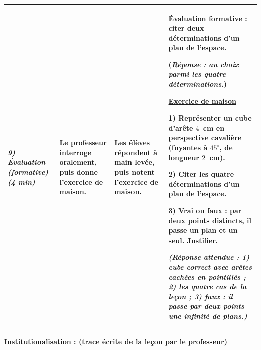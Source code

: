 \documentclass[10pt]{article}
\newcommand{\titreR}[1]{\underline{\textcolor{rougetitre}{\bfseries #1}}}
\newcommand{\maison}{\underline{\textcolor{rougemaison}{\bfseries Exercice de maison}}}
\newcommand{\moment}[1]{\textbf{\itshape #1}}
\begin{document}
\begin{longtable}{|p{2.35cm}|p{5.35cm}|p{4.55cm}|p{13.85cm}|}
\moment{9) Évaluation (formative) (4 min)} &
Le professeur interroge oralement, puis donne l'exercice de maison. &
Les élèves répondent à main levée, puis notent l'exercice de maison. &
\titreR{Évaluation formative} : citer deux déterminations d'un plan de l'espace. \par
(\textit{Réponse : au choix parmi les quatre déterminations}.) \par
\maison \par
\textbf{1)} Représenter un cube d'arête $4$~cm en perspective cavalière (fuyantes à $45^\circ$,
de longueur $2$~cm). \par
\textbf{2)} Citer les quatre déterminations d'un plan de l'espace. \par
\textbf{3)} Vrai ou faux : par deux points distincts, il passe un plan et un seul. Justifier. \par
\textit{(Réponse attendue : 1) cube correct avec arêtes cachées en pointillés ; 2) les quatre
cas de la leçon ; 3) faux : il passe par deux points une infinité de plans.)} \\ \hline
\end{longtable}

\begin{center}
\underline{\textcolor{rougetitre}{\large\bfseries Institutionalisation \; : \; (trace écrite de la leçon par le professeur)}}
\end{center}
\end{document}
